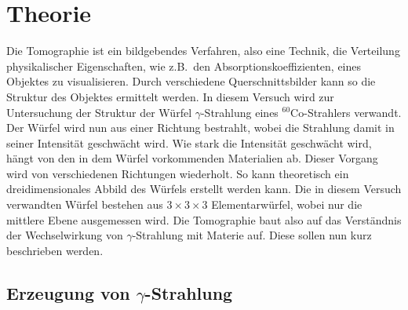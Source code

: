 

\section{Theorie}

Die Tomographie ist ein bildgebendes Verfahren, also eine Technik, die
Verteilung physikalischer Eigenschaften, wie z.B.~den Absorptionskoeffizienten,
eines Objektes zu visualisieren. Durch verschiedene Querschnittsbilder kann so
die Struktur des Objektes ermittelt werden. In diesem Versuch wird zur
Untersuchung der Struktur der Würfel $\gamma$-Strahlung eines
$^{60}\text{Co}$-Strahlers verwandt.
Der Würfel wird nun aus einer Richtung bestrahlt, wobei die Strahlung damit in
seiner Intensität geschwächt wird.
Wie stark die Intensität geschwächt wird, hängt von
den in dem Würfel vorkommenden Materialien ab. Dieser Vorgang wird von
verschiedenen Richtungen wiederholt.
So kann theoretisch ein dreidimensionales Abbild des
Würfels erstellt werden kann. Die in diesem Versuch verwandten Würfel bestehen
aus $3\times 3 \times 3$ Elementarwürfel, wobei nur die mittlere Ebene
ausgemessen wird. Die Tomographie baut also auf das Verständnis der
Wechselwirkung von $\gamma$-Strahlung mit Materie auf.
Diese sollen nun kurz beschrieben werden.

\subsection{Erzeugung von $\gamma$-Strahlung}
\label{sub:erzeugung_von_gamma_strahlung}

